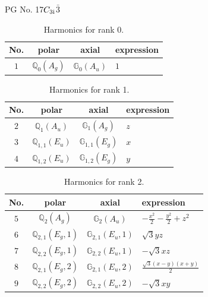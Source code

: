 \documentclass[fleqn,8pt,landscape]{jsarticle}
\begin{document}
\setcounter{MaxMatrixCols}{32}

\renewcommand{\tablename}{Table~}
\renewcommand{\figurename}{Figure~}
\begin{center}
\LARGE
PG No. 17\quad$C_{\rm 3i}$\quad$\bar{3}$\quad[ trigonal ]
\end{center}
\begin{table}[ht!]
\begin{center}
\caption{Harmonics for rank 0.}
\renewcommand{\arraystretch}{1.3}
\begin{tabular}{cccl} \hline \hline
No. & polar & axial & expression \\ \hline
$ 1 $ & $ \mathbb{Q}_{0}(A_{g}) $ & $ \mathbb{G}_{0}(A_{u}) $ & $ 1 $ \\
 \hline \hline
\end{tabular}
\end{center}
\end{table}
\begin{table}[ht!]
\begin{center}
\caption{Harmonics for rank 1.}
\renewcommand{\arraystretch}{1.3}
\begin{tabular}{cccl} \hline \hline
No. & polar & axial & expression \\ \hline
$ 2 $ & $ \mathbb{Q}_{1}(A_{u}) $ & $ \mathbb{G}_{1}(A_{g}) $ & $ z $ \\
$ 3 $ & $ \mathbb{Q}_{1,1}(E_{u}) $ & $ \mathbb{G}_{1,1}(E_{g}) $ & $ x $ \\
$ 4 $ & $ \mathbb{Q}_{1,2}(E_{u}) $ & $ \mathbb{G}_{1,2}(E_{g}) $ & $ y $ \\
 \hline \hline
\end{tabular}
\end{center}
\end{table}
\begin{table}[ht!]
\begin{center}
\caption{Harmonics for rank 2.}
\renewcommand{\arraystretch}{1.3}
\begin{tabular}{cccl} \hline \hline
No. & polar & axial & expression \\ \hline
$ 5 $ & $ \mathbb{Q}_{2}(A_{g}) $ & $ \mathbb{G}_{2}(A_{u}) $ & $ - \frac{x^{2}}{2} - \frac{y^{2}}{2} + z^{2} $ \\
$ 6 $ & $ \mathbb{Q}_{2,1}(E_{g},1) $ & $ \mathbb{G}_{2,1}(E_{u},1) $ & $ \sqrt{3} y z $ \\
$ 7 $ & $ \mathbb{Q}_{2,2}(E_{g},1) $ & $ \mathbb{G}_{2,2}(E_{u},1) $ & $ - \sqrt{3} x z $ \\
$ 8 $ & $ \mathbb{Q}_{2,1}(E_{g},2) $ & $ \mathbb{G}_{2,1}(E_{u},2) $ & $ \frac{\sqrt{3} \left(x - y\right) \left(x + y\right)}{2} $ \\
$ 9 $ & $ \mathbb{Q}_{2,2}(E_{g},2) $ & $ \mathbb{G}_{2,2}(E_{u},2) $ & $ - \sqrt{3} x y $ \\
 \hline \hline
\end{tabular}
\end{center}
\end{table}
\end{document}
